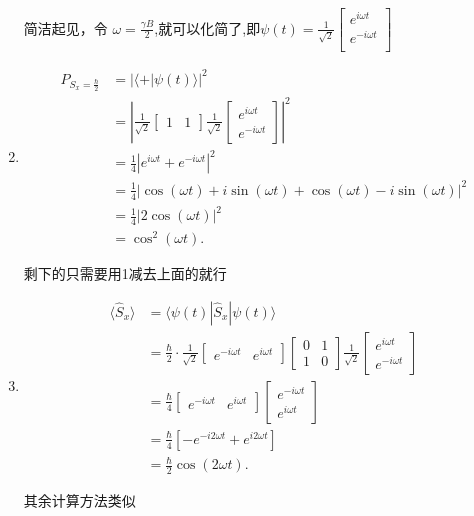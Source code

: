 \documentclass[lang=cn,10pt]{elegantbook}
\begin{document}
\begin{solution}
\begin{enumerate}
		简洁起见，令 $\omega = \frac{\gamma B}{2}$,就可以化简了,即$\psi (t)=\frac{1}{\sqrt{2}}\left[ \begin{array}{c}
			e^{i\omega t}\\
			e^{-i\omega t}\\
		\end{array} \right] $
		
		\item \begin{align*}
			P_{S_x = \frac{\hbar}{2}} &= \left| \langle + | \psi(t) \rangle \right|^2 \\
			&= \left| \frac{1}{\sqrt{2}} \begin{bmatrix} 1 & 1 \end{bmatrix} \frac{1}{\sqrt{2}} \begin{bmatrix} e^{i\omega t} \\ e^{-i\omega t} \end{bmatrix} \right|^2 \\
			&= \frac{1}{4} \left| e^{i\omega t} + e^{-i\omega t} \right|^2 \\
			&= \frac{1}{4} \left| \cos(\omega t) + i\sin(\omega t) + \cos(\omega t) - i\sin(\omega t) \right|^2 \\
			&= \frac{1}{4} \left| 2\cos(\omega t) \right|^2 \\
			&= \cos^2(\omega t).
		\end{align*} 
		
		剩下的只需要用1减去上面的就行
		
		\item \begin{align*}
			\langle \hat{S}_x \rangle &= \langle \psi(t) | \hat{S}_x | \psi(t) \rangle \\
			&= \frac{\hbar}{2} \cdot \frac{1}{\sqrt{2}} \begin{bmatrix} e^{-i\omega t} & e^{i\omega t} \end{bmatrix} \begin{bmatrix} 0 & 1 \\ 1 & 0 \end{bmatrix} \frac{1}{\sqrt{2}} \begin{bmatrix} e^{i\omega t} \\ e^{-i\omega t} \end{bmatrix} \\
			&= \frac{\hbar}{4} \begin{bmatrix} e^{-i\omega t} & e^{i\omega t} \end{bmatrix} \begin{bmatrix} e^{-i\omega t} \\ e^{i\omega t} \end{bmatrix} \\
			&= \frac{\hbar}{4} \left[ -e^{-i2\omega t} + e^{i2\omega t} \right] \\
			&= \frac{\hbar}{2} \cos(2\omega t).
		\end{align*}
		
		其余计算方法类似
	\end{enumerate}
\end{solution}
\end{document}
